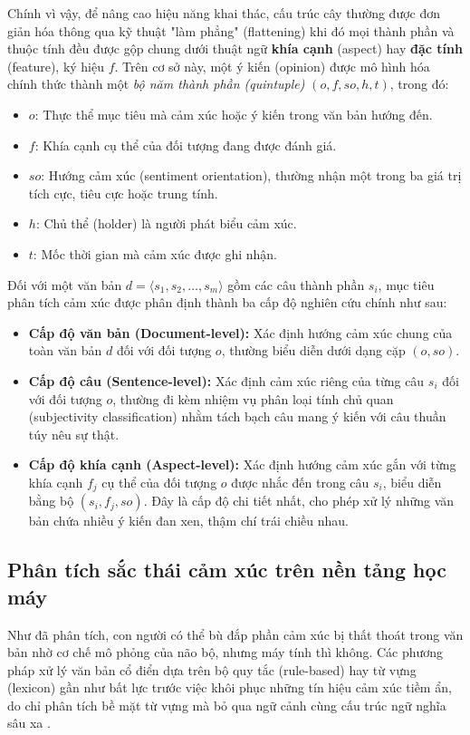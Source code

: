 Chính vì vậy, để nâng cao hiệu năng khai thác, cấu trúc cây thường được đơn giản hóa thông qua kỹ thuật "làm phẳng" (flattening) khi đó mọi thành phần và thuộc tính đều được gộp chung dưới thuật ngữ \textbf{khía cạnh} (aspect) hay \textbf{đặc tính} (feature), ký hiệu $f$. Trên cơ sở này, một ý kiến (opinion) được mô hình hóa chính thức thành một \textit{bộ năm thành phần (quintuple)} $(o, f, so, h, t)$, trong đó:
\begin{itemize}
\item $o$: Thực thể mục tiêu mà cảm xúc hoặc ý kiến trong văn bản hướng đến.
\item $f$: Khía cạnh cụ thể của đối tượng đang được đánh giá.
\item $so$: Hướng cảm xúc (sentiment orientation), thường nhận một trong ba giá trị tích cực, tiêu cực hoặc trung tính.
\item $h$: Chủ thể (holder) là người phát biểu cảm xúc.
\item $t$: Mốc thời gian mà cảm xúc được ghi nhận.
\end{itemize}
Đối với một văn bản $d = \langle s_1, s_2, \dots, s_m \rangle$ gồm các câu thành phần $s_i$, mục tiêu phân tích cảm xúc được phân định thành ba cấp độ nghiên cứu chính như sau:
\begin{itemize}
    \item \textbf{Cấp độ văn bản (Document-level):} Xác định hướng cảm xúc chung của toàn văn bản $d$ đối với đối tượng $o$, thường biểu diễn dưới dạng cặp $(o, so)$.
    \item \textbf{Cấp độ câu (Sentence-level):} Xác định cảm xúc riêng của từng câu $s_i$ đối với đối tượng $o$, thường đi kèm nhiệm vụ phân loại tính chủ quan (subjectivity classification) nhằm tách bạch câu mang ý kiến với câu thuần túy nêu sự thật.
    \item \textbf{Cấp độ khía cạnh (Aspect-level):} Xác định hướng cảm xúc gắn với từng khía cạnh $f_j$ cụ thể của đối tượng $o$ được nhắc đến trong câu $s_i$, biểu diễn bằng bộ $(s_i, f_j, so)$. Đây là cấp độ chi tiết nhất, cho phép xử lý những văn bản chứa nhiều ý kiến đan xen, thậm chí trái chiều nhau.
\end{itemize}

\subsection{Phân tích sắc thái cảm xúc trên nền tảng học máy}

Như đã phân tích, con người có thể bù đắp phần cảm xúc bị thất thoát trong văn bản nhờ cơ chế mô phỏng của não bộ, nhưng máy tính thì không. Các phương pháp xử lý văn bản cổ điển dựa trên bộ quy tắc (rule-based) hay từ vựng (lexicon) gần như bất lực trước việc khôi phục những tín hiệu cảm xúc tiềm ẩn, do chỉ phân tích bề mặt từ vựng mà bỏ qua ngữ cảnh cùng cấu trúc ngữ nghĩa sâu xa \parencite{liu2012sentiment}.

